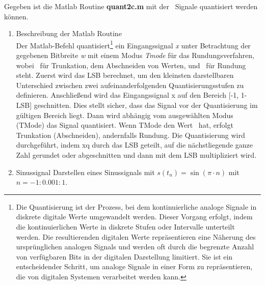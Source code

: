Gegeben ist die Matlab Routine \textbf{quant2c.m} mit der \grqq\ Signale quantisiert werden können.

\begin{enumerate}[label=\alph*)]
	\item Beschreibung der Matlab Routine \\
	Der Matlab-Befehl  quantisiert\footnote{Die Quantisierung ist der Prozess, bei dem kontinuierliche analoge Signale in diskrete digitale Werte umgewandelt werden. Dieser Vorgang erfolgt, indem die kontinuierlichen Werte in diskrete Stufen oder Intervalle unterteilt werden. Die resultierenden digitalen Werte repräsentieren eine Näherung des ursprünglichen analogen Signals und werden oft durch die begrenzte Anzahl von verfügbaren Bits in der digitalen Darstellung limitiert. Sie ist ein entscheidender Schritt, um analoge Signale in einer Form zu repräsentieren, die von digitalen Systemen verarbeitet werden kann.} ein Eingangssignal \textit{x} unter Betrachtung der gegebenen Bitbreite \textit{w} mit einem Modus \textit{Tmode} für das Rundungsverfahren, wobei \grq\ für Trunkation, dem Abschneiden von Werten, und \grq\ für Rundung steht. Zuerst wird das LSB berechnet, um den kleinsten darstellbaren Unterschied zwischen zwei aufeinanderfolgenden Quantisierungsstufen zu definieren. Anschließend wird das Eingangssignal x auf den Bereich [-1, 1-LSB] geschnitten. Dies stellt sicher, dass das Signal vor der Quantisierung im gültigen Bereich liegt. Dann wird abhängig vom ausgewählten Modus (TMode) das Signal quantisiert. Wenn TMode den Wert \grq\ hat, erfolgt Trunkation (Abschneiden), andernfalls Rundung. Die Quantisierung wird durchgeführt, indem xq durch das LSB geteilt, auf die nächstliegende ganze Zahl gerundet oder abgeschnitten und dann mit dem LSB multipliziert wird. \\
	
	\item Sinussignal
	Darstellen eines Sinussignals mit $s(t_n)=\sin(\pi\cdot{n})$ mit $n=-1 : 0.001 : 1$. \\
	\clearpage
	

\end{enumerate}
